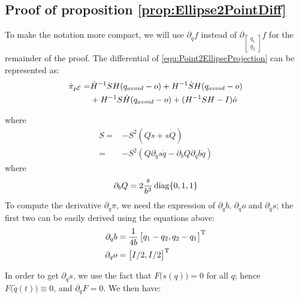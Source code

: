 \documentclass[10pt,twocolumn,twoside]{IEEEtran}
\begin{document}
  \subsection{Proof of proposition \ref{prop:Ellipse2PointDiff}}\label{proof:Ellipse2PointDiff}
      To make the notation more compact, we will use $\partial_q f$ instead of $\partial_{\left[\begin{smallmatrix}q_1\\q_2\end{smallmatrix}\right]} f$ for the remainder of the proof.
    The differential of \eqref{equ:Point2EllipseProjection} can be represented as:
    \begin{equation}\label{equ:dPi_dt}
      \begin{split}
        \dot \pi_{p\mathcal{E}} = &  \dot H^{-1}SH (q_{avoid} - o)  + H^{-1}\dot S H (q_{avoid} - o) \\
        &+ H^{-1}S \dot H (q_{avoid} - o) + (H^{-1}SH -I)\dot o\\
      \end{split}
    \end{equation}

    where
    \begin{equation}\label{equ:S_dot}
      \begin{split}
        \dot S  =& - S^2 (Q \dot s + s \dot Q)\\
        =& - S^2 (Q \partial_q s \dot q - \partial_b Q \partial_q b \dot q)
      \end{split}
    \end{equation}
    where
    \begin{equation}
      \partial_b Q = 2\frac{s}{b^3} \operatorname{diag}\{0,1,1\}
    \end{equation}
    To compute the derivative $\partial_q \pi$, we need the expression of $\partial_q b$, $\partial_q o$ and $\partial_q s$; the first two can be easily derived using the equations above:
    \begin{align}
      \partial_q b &= \frac{1}{4b}\begin{bmatrix}q_1-q_2,q_2-q_1\end{bmatrix}^\mathrm{T}\\
      \partial_q o &= \begin{bmatrix}I/2,I/2\end{bmatrix}^\mathrm{T}
    \end{align}

    In order to get $\partial_q s$, we use the fact that $F\bigl(s(q)\bigr)=0$ for all $q$; hence $F\bigl(\tilde{q}(t)\bigr)\equiv 0$, and $\partial_q F = 0$. We then have:
\end{document}
